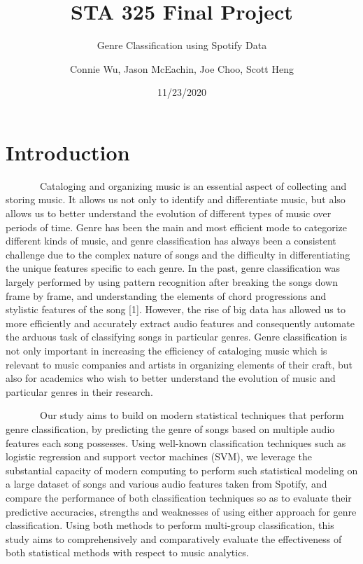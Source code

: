 \documentclass[
]{article}
\title{STA 325 Final Project}
\subtitle{Genre Classification using Spotify Data}
\author{Connie Wu, Jason McEachin, Joe Choo, Scott Heng}
\date{11/23/2020}
\begin{document}
\maketitle

\hypertarget{introduction}{%
\section{Introduction}\label{introduction}}

~~~~~~~Cataloging and organizing music is an essential aspect of
collecting and storing music. It allows us not only to identify and
differentiate music, but also allows us to better understand the
evolution of different types of music over periods of time. Genre has
been the main and most efficient mode to categorize different kinds of
music, and genre classification has always been a consistent challenge
due to the complex nature of songs and the difficulty in differentiating
the unique features specific to each genre. In the past, genre
classification was largely performed by using pattern recognition after
breaking the songs down frame by frame, and understanding the elements
of chord progressions and stylistic features of the song {[}1{]}.
However, the rise of big data has allowed us to more efficiently and
accurately extract audio features and consequently automate the arduous
task of classifying songs in particular genres. Genre classification is
not only important in increasing the efficiency of cataloging music
which is relevant to music companies and artists in organizing elements
of their craft, but also for academics who wish to better understand the
evolution of music and particular genres in their research.

~~~~~~~Our study aims to build on modern statistical techniques that
perform genre classification, by predicting the genre of songs based on
multiple audio features each song possesses. Using well-known
classification techniques such as logistic regression and support vector
machines (SVM), we leverage the substantial capacity of modern computing
to perform such statistical modeling on a large dataset of songs and
various audio features taken from Spotify, and compare the performance
of both classification techniques so as to evaluate their predictive
accuracies, strengths and weaknesses of using either approach for genre
classification. Using both methods to perform multi-group
classification, this study aims to comprehensively and comparatively
evaluate the effectiveness of both statistical methods with respect to
music analytics.
\end{document}
